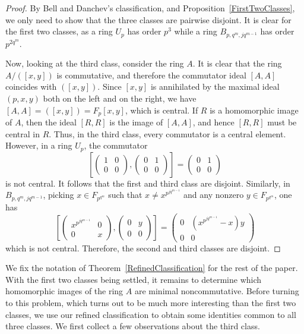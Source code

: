 \documentclass[11pt]{article}
\theoremstyle{definition}
\begin{document}
\begin{proof}
By Bell and Danchev's classification, and Proposition~\ref{FirstTwoClasses}, we only need to show that the three classes are pairwise disjoint. It is clear for the first two classes, as a ring $U_p$ has order $p^3$ while a ring $B_{p,q^m,jq^{m-1}}$ has order $p^{2q^m}$.

Now, looking at the third class, consider the ring $A$. It is clear that the ring $A/([x,y])$ is commutative, and therefore the commutator ideal $[A,A]$ coincides with $([x,y])$. Since $[x,y]$ is annihilated by the maximal ideal $(p,x,y)$ both on the left and on the right, we have $[A,A]=([x,y])=F_p[x,y]$, which is central. If $R$ is a homomorphic image of $A$, then the ideal $[R,R]$ is the image of $[A,A]$, and hence $[R,R]$ must be central in $R$. Thus, in the third class, every commutator is a central element. However, in a ring $U_p$, the commutator
\[\left[\begin{pmatrix}
1&0\\
0&0
\end{pmatrix},\begin{pmatrix}
0&1\\
0&0
\end{pmatrix}\right]=\begin{pmatrix}
0&1\\
0&0
\end{pmatrix}\]
is not central. It follows that the first and third class are disjoint. Similarly, in $B_{p,q^m,jq^{m-1}}$, picking $x\in F_{p^{q^m}}$ such that $x\neq x^{p^{jq^{m-1}}}$ and any nonzero $y\in F_{p^{q^m}}$, one has
\[\left[\begin{pmatrix}
x^{p^{jq^{m-1}}}&0\\
0&x
\end{pmatrix},\begin{pmatrix}
0&y\\
0&0
\end{pmatrix}\right]=\begin{pmatrix}
0&\left(x^{p^{jq^{m-1}}}-x\right)y\\
0&0
\end{pmatrix}\]
which is not central. Therefore, the second and third classes are disjoint.
\end{proof}

We fix the notation of Theorem~\ref{RefinedClassification} for the rest of the paper. With the first two classes being settled, it remains to determine which homomorphic images of the ring $A$ are minimal noncommutative. Before turning to this problem, which turns out to be much more interesting than the first two classes, we use our refined classification to obtain some identities common to all three classes. We first collect a few observations about the third class.
\end{document}
